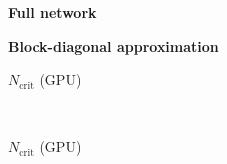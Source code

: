 \begin{table*}[tb]
  \vspace{5ex}




  \begin{footnotesize}
    \textbf{\cifarten \resnetfiftysix}
  \end{footnotesize}

  \begin{minipage}{0.49\linewidth}
    \centering
    \begin{footnotesize}
      \textbf{Full network}
    \end{footnotesize}
  \end{minipage}
  \hfill
  \begin{minipage}{0.49\linewidth}
    \centering
    \begin{footnotesize}
      \textbf{Block-diagonal approximation}
    \end{footnotesize}
  \end{minipage}
  \vspace{1ex}

  \begin{minipage}{0.245\linewidth}
    \centering
    \begin{footnotesize}
      $N_{\text{crit}}$ (GPU)
    \end{footnotesize}
    \vspace{0.15\baselineskip}

    \begin{footnotesize}
      
    \end{footnotesize}
  \end{minipage}
  \hfill
  \begin{minipage}{0.245\linewidth}
  \textcolor{white}{.}

  \end{minipage}
  \hfill
  \begin{minipage}{0.245\linewidth}
    \centering
    \begin{footnotesize}
      $N_{\text{crit}}$ (GPU)
    \end{footnotesize}
    \vspace{0.15\baselineskip}


\end{minipage}
\end{table*}
